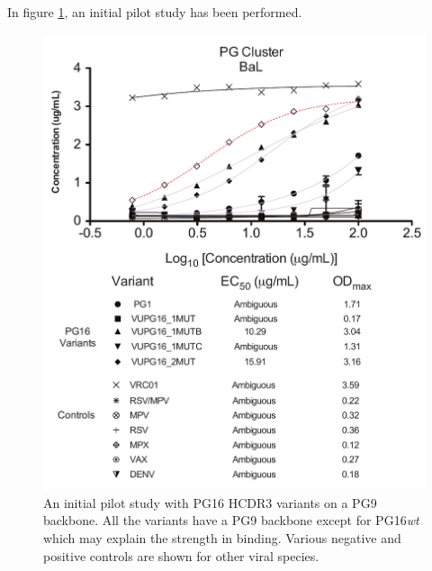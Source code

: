 In figure \ref{fig:fig5_4}, an initial pilot study has been performed.

\begin{figure}[!t]
   \centering
   \includegraphics[width=.9\textwidth]{images/chapter5/figure5_4.pdf}
   \caption[Binding Profile of PG16 Variants]{An initial pilot study with PG16 HCDR3 variants on a PG9 backbone. All the variants have a PG9 backbone except for PG16\textit{wt} which may explain the strength in binding. Various negative and positive controls are shown for other viral species.}
    \label{fig:fig5_4}
\end{figure}



